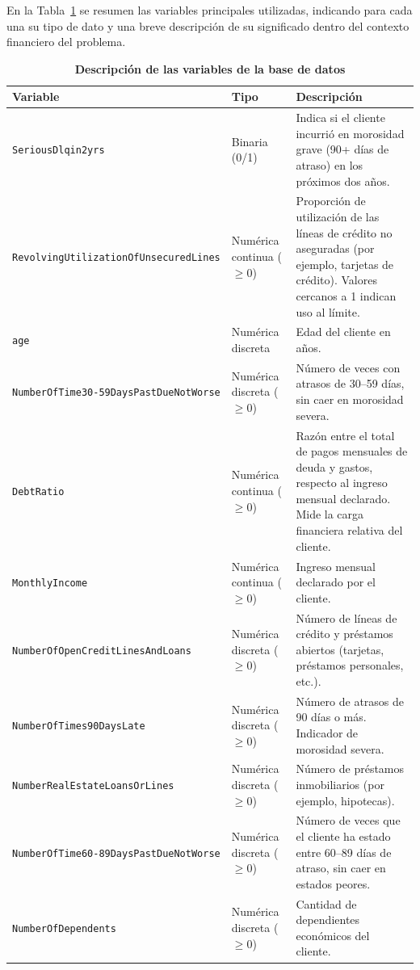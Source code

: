 \documentclass[a4paper,12pt]{article}
\begin{document}
En la Tabla~\ref{tab:variables} se resumen las variables principales utilizadas, indicando para cada una su tipo de dato y una 
breve descripción de su significado dentro del contexto financiero del problema. 

\begin{table}[H]
\centering
{}
\caption{\textbf{Descripción de las variables de la base de datos}}
\label{tab:variables}
\small
\begin{tabular}{p{5cm} p{3 cm} p{7.5cm}}
\toprule
\rowcolor{lavanda!30}
\textbf{Variable} & \textbf{Tipo} & \textbf{Descripción} \\
\midrule

\texttt{SeriousDlqin2yrs} & Binaria (0/1) &
Indica si el cliente incurrió en morosidad grave (90+ días de atraso) en los próximos dos años. \\

\texttt{RevolvingUtilizationOfUnsecuredLines} & Numérica continua ($\ge 0$) & Proporción de utilización 
de las líneas de crédito no aseguradas (por ejemplo, tarjetas de crédito). Valores cercanos a 1 
indican uso al límite. \\

\texttt{age} & Numérica discreta &
Edad del cliente en años. \\

\texttt{NumberOfTime30-59DaysPastDueNotWorse} & Numérica discreta ($\ge 0$) &
Número de veces con atrasos de 30--59 días, sin caer en morosidad severa. \\

\texttt{DebtRatio} & Numérica continua ($\ge 0$) &
Razón entre el total de pagos mensuales de deuda y gastos, respecto al ingreso mensual declarado. Mide la carga financiera 
relativa del cliente. \\

\texttt{MonthlyIncome} & Numérica continua ($\ge 0$) &
Ingreso mensual declarado por el cliente. \\

\texttt{NumberOfOpenCreditLinesAndLoans} & Numérica discreta ($\ge 0$) &
Número de líneas de crédito y préstamos abiertos (tarjetas, préstamos personales, etc.). \\

\texttt{NumberOfTimes90DaysLate} & Numérica discreta ($\ge 0$) &
Número de atrasos de 90 días o más. Indicador de morosidad severa. \\

\texttt{NumberRealEstateLoansOrLines} & Numérica discreta ($\ge 0$) &
Número de préstamos inmobiliarios (por ejemplo, hipotecas). \\

\texttt{NumberOfTime60-89DaysPastDueNotWorse} & Numérica discreta ($\ge 0$) &
Número de veces que el cliente ha estado entre 60--89 días de atraso, sin caer en estados peores. \\

\texttt{NumberOfDependents} & Numérica discreta ($\ge 0$) &
Cantidad de dependientes económicos del cliente. \\

\bottomrule
\end{tabular}
\end{table}
\end{document}
